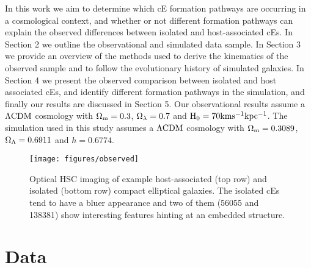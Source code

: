 \documentclass[a4paper,fleqn,usenatbib]{mnras}
\begin{document}
In this work we aim to determine which cE formation pathways are occurring in a cosmological context, and whether or not different formation pathways can explain the observed differences between isolated and host-associated cEs. In Section 2 we outline the observational and simulated data sample. In Section 3 we provide an overview of the methods used to derive the kinematics of the observed sample and to follow the evolutionary history of simulated galaxies. In Section 4 we present the observed comparison between isolated and host associated cEs, and identify different formation pathways in the simulation, and finally our results are discussed in Section 5. Our observational results assume a ${\rm \Lambda CDM}$ cosmology with ${\rm \Omega_{m}}=0.3$, ${\rm \Omega_{\lambda}}=0.7$ and ${\rm H_{0}=70 km s^{-1} kpc^{-1}}$. The simulation used in this study assumes a ${\rm \Lambda CDM}$ cosmology with ${\rm \Omega_{m}}=0.3089$, ${\rm \Omega_{\Lambda}}=0.6911$ and ${h=0.6774}$.
 




\begin{figure*}
\texttt{[image: figures/observed]}
   \caption{Optical HSC imaging of example host-associated (top row) and isolated (bottom row) compact elliptical galaxies. The isolated cEs tend to have a bluer appearance and two of them (56055 and 138381) show interesting features hinting at an embedded structure. }
 \label{images}
 \end{figure*}


\section{Data}
\label{data}
\end{document}
